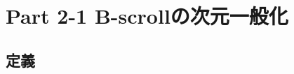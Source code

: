 \documentclass[dvipdfmx, xcolor=svgnames]{beamer}
\theoremstyle{plain}
\theoremstyle{definition}
\theoremstyle{remark}
\def\Rnum#1{\uppercase\expandafter{\romannumeral #1}}
\begin{document}
\section{Part 2-1 \quad B-scrollの次元一般化}


\subsection{定義}
\end{document}
